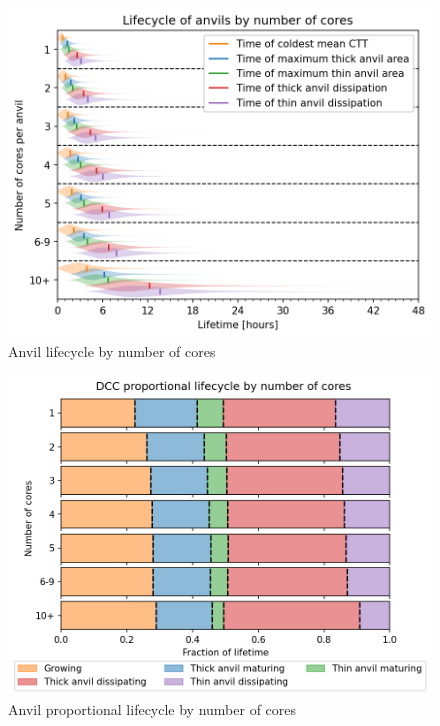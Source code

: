 \begin{figure}[tp]
    \centering
    \includegraphics[width=\textwidth]{figures/ch2_25.png}
    \caption{Anvil lifecycle by number of cores}
    \label{fig:anvil_number_of_cores_lifecycle}
\end{figure}

\begin{figure}[tp]
    \centering
    \includegraphics[width=\textwidth]{figures/ch2_26.png}
    \caption{Anvil proportional lifecycle by number of cores}
    \label{fig:anvil_number_of_cores_proportional_lifecycle}
\end{figure}


